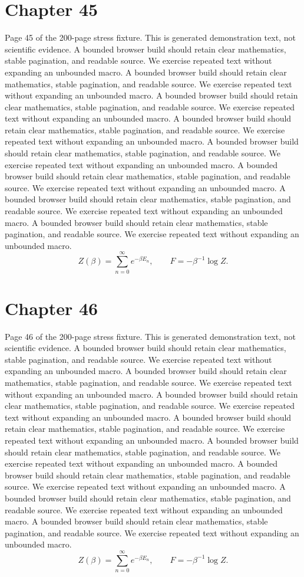 \documentclass[11pt]{article}
\begin{document}
\section*{Chapter 45}
Page 45 of the 200-page stress fixture. This is generated demonstration text, not scientific evidence.
A bounded browser build should retain clear mathematics, stable pagination, and readable source. We exercise repeated text without expanding an unbounded macro.
A bounded browser build should retain clear mathematics, stable pagination, and readable source. We exercise repeated text without expanding an unbounded macro.
A bounded browser build should retain clear mathematics, stable pagination, and readable source. We exercise repeated text without expanding an unbounded macro.
A bounded browser build should retain clear mathematics, stable pagination, and readable source. We exercise repeated text without expanding an unbounded macro.
A bounded browser build should retain clear mathematics, stable pagination, and readable source. We exercise repeated text without expanding an unbounded macro.
A bounded browser build should retain clear mathematics, stable pagination, and readable source. We exercise repeated text without expanding an unbounded macro.
A bounded browser build should retain clear mathematics, stable pagination, and readable source. We exercise repeated text without expanding an unbounded macro.
A bounded browser build should retain clear mathematics, stable pagination, and readable source. We exercise repeated text without expanding an unbounded macro.
\[Z(\beta)=\sum_{n=0}^{\infty}e^{-\beta E_n},\qquad F=-\beta^{-1}\log Z.\]
\newpage
\section*{Chapter 46}
Page 46 of the 200-page stress fixture. This is generated demonstration text, not scientific evidence.
A bounded browser build should retain clear mathematics, stable pagination, and readable source. We exercise repeated text without expanding an unbounded macro.
A bounded browser build should retain clear mathematics, stable pagination, and readable source. We exercise repeated text without expanding an unbounded macro.
A bounded browser build should retain clear mathematics, stable pagination, and readable source. We exercise repeated text without expanding an unbounded macro.
A bounded browser build should retain clear mathematics, stable pagination, and readable source. We exercise repeated text without expanding an unbounded macro.
A bounded browser build should retain clear mathematics, stable pagination, and readable source. We exercise repeated text without expanding an unbounded macro.
A bounded browser build should retain clear mathematics, stable pagination, and readable source. We exercise repeated text without expanding an unbounded macro.
A bounded browser build should retain clear mathematics, stable pagination, and readable source. We exercise repeated text without expanding an unbounded macro.
A bounded browser build should retain clear mathematics, stable pagination, and readable source. We exercise repeated text without expanding an unbounded macro.
\[Z(\beta)=\sum_{n=0}^{\infty}e^{-\beta E_n},\qquad F=-\beta^{-1}\log Z.\]
\newpage
\end{document}
